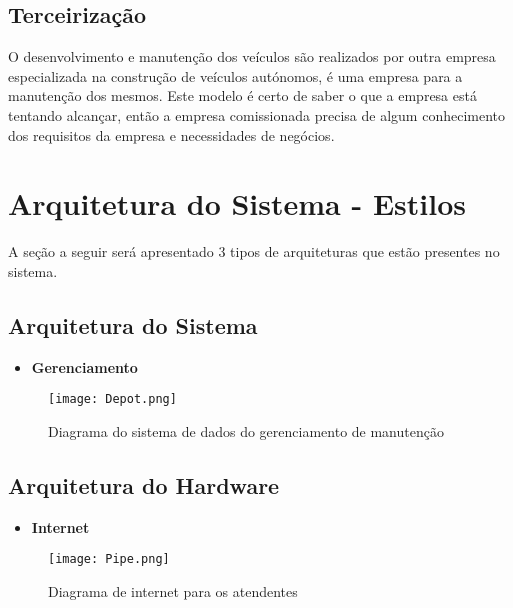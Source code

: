 \subsection{Terceirização}
O desenvolvimento e manutenção dos veículos são realizados por outra empresa especializada na construção de veículos autónomos, é uma empresa para a manutenção dos mesmos. Este modelo é certo de saber o que a empresa está tentando alcançar, então a empresa comissionada precisa de algum conhecimento dos requisitos da empresa e necessidades de negócios.



\section{Arquitetura do Sistema - Estilos}

A seção a seguir será apresentado 3 tipos de arquiteturas que estão presentes no sistema.



\subsection{Arquitetura do Sistema}

\begin{itemize}

\item \textbf{Gerenciamento}
\end{itemize}
\begin{figure}[H]
          \begin{center}
              \caption{Diagrama do sistema de dados do gerenciamento de manutenção} \label{afp}
              \texttt{[image: Depot.png]} \\

          \end{center}
         \end{figure}





\subsection{Arquitetura do Hardware}


\begin{itemize}

\item \textbf{Internet}
\end{itemize}
\begin{figure}[H]
     \begin{center}
         \caption{Diagrama de internet para os atendentes} \label{afp}
         \texttt{[image: Pipe.png]} \\

     \end{center}
    \end{figure}


